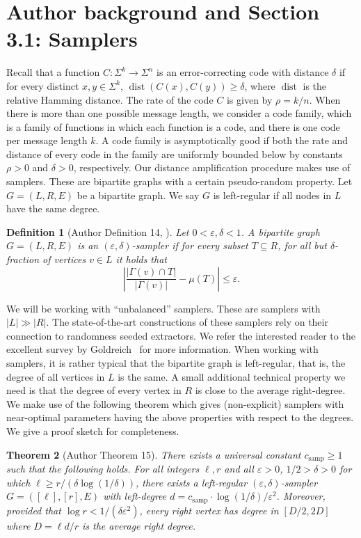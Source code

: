 \documentclass[10pt,a4paper]{article}
\newtheorem{nttheorem}{Theorem}
\newtheorem{ntdefinition}[nttheorem]{Definition}
\begin{document}
\section*{Author background and Section 3.1: Samplers}
Recall that a function $C:\Sigma^k\to\Sigma^n$ is an error-correcting code with distance $\delta$ if for every distinct $x,y\in\Sigma^k$, $\operatorname{dist}(C(x),C(y))\geq\delta$, where $\operatorname{dist}$ is the relative Hamming distance. The rate of the code $C$ is given by $\rho=k/n$. When there is more than one possible message length, we consider a code family, which is a family of functions in which each function is a code, and there is one code per message length $k$. A code family is asymptotically good if both the rate and distance of every code in the family are uniformly bounded below by constants $\rho>0$ and $\delta>0$, respectively.
Our distance amplification procedure makes use of samplers. These are bipartite graphs with a certain pseudo-random property. Let $G=(L,R,E)$ be a bipartite graph. We say $G$ is left-regular if all nodes in $L$ have the same degree.
\setcounter{nttheorem}{13}
\begin{ntdefinition}[Author Definition 14, {\cite{ref9}}]
Let $0<\varepsilon,\delta<1$. A bipartite graph $G=(L,R,E)$ is an $(\varepsilon,\delta)$-sampler if for every subset $T\subseteq R$, for all but $\delta$-fraction of vertices $v\in L$ it holds that
\[\left|\frac{|\Gamma(v)\cap T|}{|\Gamma(v)|}-\mu(T)\right|\leq\varepsilon.\]
\end{ntdefinition}
We will be working with ``unbalanced'' samplers. These are samplers with $|L|\gg|R|$. The state-of-the-art constructions of these samplers rely on their connection to randomness seeded extractors. We refer the interested reader to the excellent survey by Goldreich~\cite{ref17} for more information. When working with samplers, it is rather typical that the bipartite graph is left-regular, that is, the degree of all vertices in $L$ is the same. A small additional technical property we need is that the degree of every vertex in $R$ is close to the average right-degree. We make use of the following theorem which gives (non-explicit) samplers with near-optimal parameters having the above properties with respect to the degrees. We give a proof sketch for completeness.
\begin{nttheorem}[Author Theorem 15]
There exists a universal constant $c_{\mathrm{samp}}\geq1$ such that the following holds. For all integers $\ell,r$ and all $\varepsilon>0$, $1/2>\delta>0$ for which $\ell\geq r/(\delta\log(1/\delta))$, there exists a left-regular $(\varepsilon,\delta)$-sampler $G=([\ell],[r],E)$ with left-degree $d=c_{\mathrm{samp}}\cdot\log(1/\delta)/\varepsilon^2$. Moreover, provided that $\log r<1/(\delta\varepsilon^2)$, every right vertex has degree in $[D/2,2D]$ where $D=\ell d/r$ is the average right degree.
\end{nttheorem}
\end{document}
